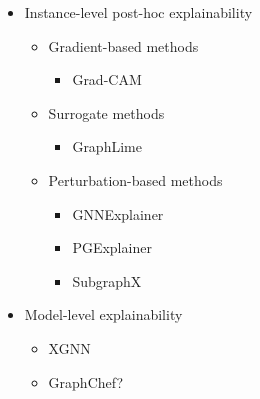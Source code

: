 \begin{itemize}
\begin{itemize}
			\item Instance-level post-hoc explainability
				\begin{itemize}
					\item Gradient-based methods
						\begin{itemize}
							\item Grad-CAM
						\end{itemize}
					\item Surrogate methods
						\begin{itemize}
							\item GraphLime
						\end{itemize}
					\item Perturbation-based methods
						\begin{itemize}
							\item GNNExplainer
							\item PGExplainer
							\item SubgraphX
						\end{itemize}
				\end{itemize}
			\item Model-level explainability
				\begin{itemize}
					\item XGNN
					\item GraphChef?
				\end{itemize}
		\end{itemize}
\end{itemize}
